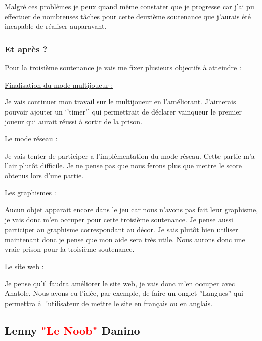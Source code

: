 \documentclass{article}
\begin{document}
\par
Malgré ces problèmes je peux quand même constater que je progresse car j’ai pu effectuer de nombreuses tâches pour cette deuxième soutenance que j’aurais été incapable de réaliser auparavant.
\newline
  
\subsubsection{Et après ?}

Pour la troisième soutenance je vais me fixer plusieurs objectifs à atteindre :
\newline

\underline{Finalisation du mode multijoueur :}
\newline
\par
Je vais continuer mon travail sur le multijoueur en l'améliorant. J’aimerais pouvoir ajouter un ‘’timer’’ qui permettrait de déclarer vainqueur le premier joueur qui aurait réussi à sortir de la prison.  
\newline

\underline{Le mode réseau :}
\newline
\par
Je vais tenter de participer a l'implémentation du mode réseau. Cette partie m'a l'air plutôt difficile. Je ne pense pas que nous ferons plus que mettre le score obtenus lors d'une partie.
\newline

\underline{Les graphismes :}
\newline
\par
Aucun objet apparait encore dans le jeu car nous n'avons pas fait leur graphisme, je vais donc m'en occuper pour cette troisième soutenance. Je pense aussi participer au graphisme correspondant au décor. Je sais plutôt bien utiliser  maintenant donc je pense que mon aide sera très utile. Nous aurons donc une vraie prison pour la troisième soutenance.  
\newline

\underline{Le site web :}
\newline
\par
Je pense qu'il faudra améliorer le site web, je vais donc m'en occuper avec Anatole. Nous avons eu l'idée, par exemple, de faire un onglet ''Langues'' qui permettra à l'utilisateur de mettre le site en français ou en anglais.    

\newpage

\subsection{Lenny \textcolor{red}{"Le Noob"} Danino}
\end{document}
